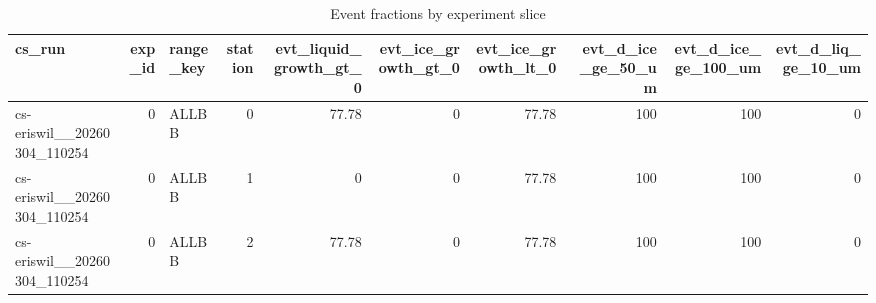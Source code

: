 \begin{table}[htbp]
\centering
\small
\caption{Event fractions by experiment slice}
\label{tab:ensemble_events_wide}
\begin{tabular}{lrlrrrrrrr}
\toprule
cs\_run & exp\_id & range\_key & station & evt\_liquid\_growth\_gt\_0 & evt\_ice\_growth\_gt\_0 & evt\_ice\_growth\_lt\_0 & evt\_d\_ice\_ge\_50\_um & evt\_d\_ice\_ge\_100\_um & evt\_d\_liq\_ge\_10\_um \\
\midrule
cs-eriswil\_\_20260304\_110254 & 0 & ALLBB & 0 & 77.78 & 0 & 77.78 & 100 & 100 & 0 \\
cs-eriswil\_\_20260304\_110254 & 0 & ALLBB & 1 & 0 & 0 & 77.78 & 100 & 100 & 0 \\
cs-eriswil\_\_20260304\_110254 & 0 & ALLBB & 2 & 77.78 & 0 & 77.78 & 100 & 100 & 0 \\
\bottomrule
\end{tabular}

\end{table}
